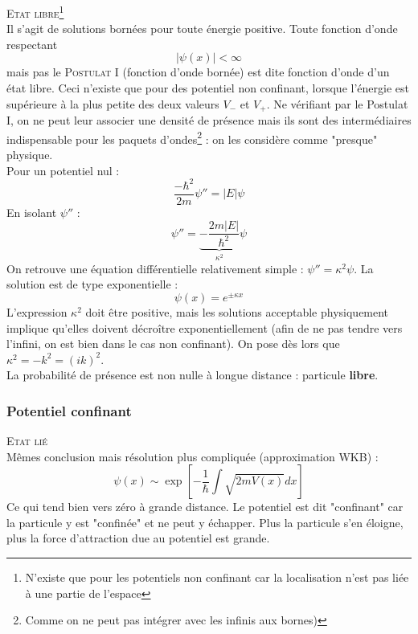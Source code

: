 \documentclass[british,french,11pt, a4paper, openany]{book}
\begin{document}
	\textsc{Etat libre}\footnote{N'existe que pour les potentiels non confinant car la localisation n'est pas liée à une partie de l'espace}\\
	Il s'agit de solutions bornées pour toute énergie positive. Toute fonction d'onde respectant 
	\begin{equation}
		|\psi(x)| < \infty
	\end{equation}
	mais pas le \textsc{Postulat I} (fonction d'onde bornée) est dite fonction d'onde d'un état libre. Ceci n'existe que pour des potentiel non confinant, lorsque l'énergie est supérieure à la plus petite des deux valeurs $V_-$ et $V_+$. Ne vérifiant par le Postulat I, on ne peut leur associer une densité de présence mais ils sont des intermédiaires indispensable pour les paquets d'ondes\footnote{Comme on ne peut pas intégrer avec les infinis aux bornes)} : on les considère comme "presque" physique. \\
	Pour un potentiel nul :
	\begin{equation}
		\frac{-\hbar^2}{2m}\psi'' = |E|\psi
	\end{equation}
	En isolant $\psi''$ :
	\begin{equation}
		\psi'' = \underbrace{-\dfrac{2m|E|}{\hbar^2}}_{\kappa^2}\psi
	\end{equation}
	On retrouve une équation différentielle relativement simple : $\psi'' = \kappa^2\psi$. La solution est de type exponentielle :
	\begin{equation}
		\psi(x) = e^{\pm \kappa x}
	\end{equation}
	L'expression $\kappa^2$ doit être positive, mais les solutions acceptable physiquement implique qu'elles doivent décroître exponentiellement (afin de ne pas tendre vers l'infini, on est bien dans le cas non confinant). On pose dès lors que $\kappa^2 = -k^2 = (ik)^2$.\\
	La probabilité de présence est non nulle à longue distance : particule \textbf{libre}.
	
	
	\subsubsection*{Potentiel confinant}
	\textsc{Etat lié}\\
	Mêmes conclusion mais résolution plus compliquée (approximation WKB) :
	\begin{equation}
		\psi(x) \sim \exp\left[ -\frac{1}{\hbar}\int\sqrt{2mV(x)}dx\right]
	\end{equation}
	Ce qui tend bien vers zéro à grande distance. Le potentiel est dit "confinant" car la particule y est "confinée" et ne peut y échapper. Plus la particule s'en éloigne, plus la force d'attraction due au potentiel est grande.
	
\end{document}
